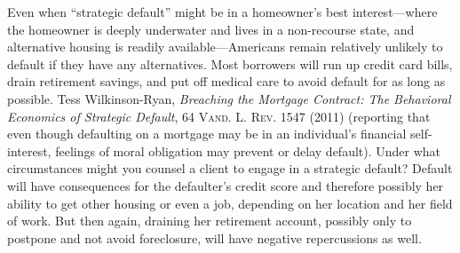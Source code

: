 Even when ``strategic default'' might be in a homeowner's best interest---where
the homeowner is deeply underwater and lives in a non-recourse state, and
alternative housing is readily available---Americans remain relatively
unlikely to default if they have any alternatives.  Most borrowers will run up
credit card bills, drain retirement savings, and put off medical care to avoid
default for as long as possible.  Tess Wilkinson-Ryan, \textit{Breaching the
Mortgage Contract: The Behavioral Economics of Strategic Default}, 64
\textsc{Vand. L. Rev.} 1547 (2011) (reporting that even though defaulting on a
mortgage may be in an individual's financial self-interest, feelings of moral
obligation may prevent or delay default).  Under what circumstances might you
counsel a client to engage in a strategic default?  Default will have
consequences for the defaulter's credit score and therefore possibly her
ability to get other housing or even a job, depending on her location and her
field of work.  But then again, draining her retirement account, possibly only
to postpone and not avoid foreclosure, will have negative repercussions as
well.


